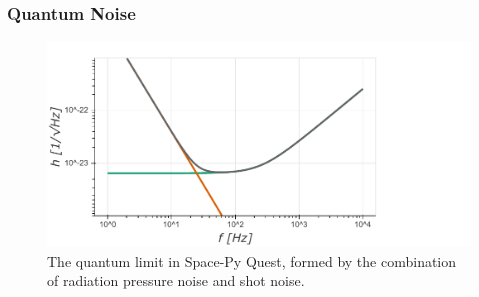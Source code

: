 \documentclass{article}
\begin{document}
      \subsubsection*{Quantum Noise} 
    \begin{figure}[h!]
    \centering
    \hspace{2cm}
    \includegraphics[height=0.35\textwidth]{SPQ_quantum.pdf}
    \caption{The quantum limit in Space-Py Quest, formed by the combination of radiation pressure noise and shot noise.}
    \label{fig:quantum}
    \end{figure}
\end{document}

